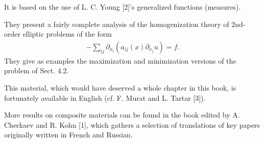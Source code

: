 \documentclass{book}
\numberwithin{equation}{section}
\begin{document}
\begin{enumerate}
    It is based on the use of L. C. Young [2]'s generalized functions (measures).
    
    They present a fairly complete analysis of the homogenization theory of 2nd-order elliptic problems of the form
    \begin{align*}
        -\sum_{ij} \partial_{x_i}\left(a_{ij}(x)\partial_{x_j}u\right) = f.
    \end{align*}
    They give as examples the maximization and minimization versions of the problem of Sect. 4.2.
    
    This material, which would have deserved a whole chapter in this book, is fortunately available in English (cf. F. Murat and L. Tartar [3]).
    
    More results on composite materials can be found in the book edited by A. Cherkaev and R. Kohn [1], which gathers a selection of translations of key papers originally written in French and Russian.
\end{enumerate}
\end{document}
